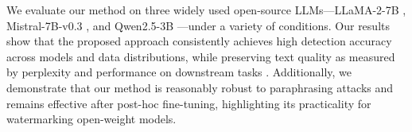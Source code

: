 We evaluate our method on three widely used open-source LLMs—LLaMA-2-7B \citep{touvron2023llama}, Mistral-7B-v0.3 \citep{jiang2023mistral7b}, and Qwen2.5-3B \citep{qwen2025qwen25technicalreport}—under a variety of conditions. Our results show that the proposed approach consistently achieves high detection accuracy across models and data distributions, while preserving text quality as measured by perplexity and performance on downstream tasks . Additionally, we demonstrate that our method is reasonably robust to paraphrasing attacks and remains effective after post-hoc fine-tuning, highlighting its practicality for watermarking open-weight models.